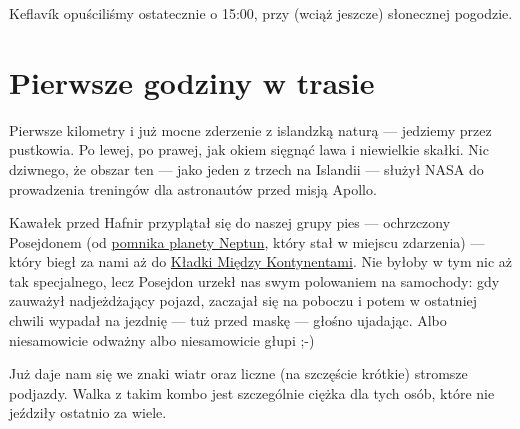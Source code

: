Keflavík opuściliśmy ostatecznie o 15:00, przy (wciąż jeszcze) słonecznej pogodzie.


\section*{Pierwsze godziny w trasie}

Pierwsze kilometry i już mocne zderzenie z islandzką naturą --- jedziemy przez pustkowia. Po lewej, po prawej, jak okiem sięgnąć lawa i niewielkie skałki. Nic dziwnego, że obszar ten --- jako jeden z trzech na Islandii --- służył NASA do prowadzenia treningów dla astronautów przed misją Apollo.



Kawałek przed Hafnir przyplątał się do naszej grupy pies --- ochrzczony Posejdonem (od \href{https://www.facebook.com/120832791270880/photos/a.612815058739315.1073741825.120832791270880/612815132072641/?type=3&theater}{pomnika planety Neptun}, który stał w miejscu zdarzenia) --- który biegł za nami aż do \href{http://www.visitreykjanes.is/searchresults/attraction/bridge-between-continents}{Kładki Między Kontynentami}. Nie byłoby w tym nic aż tak specjalnego, lecz Posejdon urzekł nas swym polowaniem na samochody: gdy zauważył nadjeżdżający pojazd, zaczajał się na poboczu i potem w ostatniej chwili wypadał na jezdnię --- tuż przed maskę --- głośno ujadając. Albo niesamowicie odważny albo niesamowicie głupi ;-)

Już daje nam się we znaki wiatr oraz liczne (na szczęście krótkie) stromsze podjazdy. Walka z takim kombo jest szczególnie ciężka dla tych osób, które nie jeździły ostatnio za wiele.


